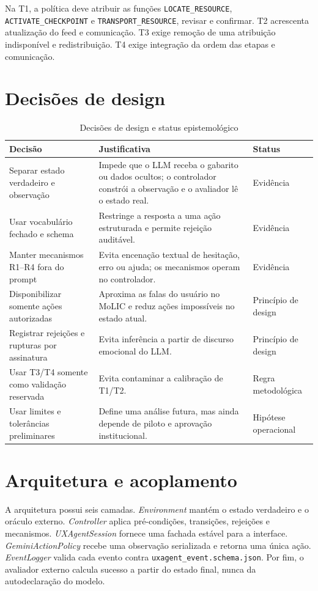 \documentclass[conference]{IEEEtran}
\begin{document}
Na T1, a política deve atribuir as funções
\texttt{LOCATE\_RESOURCE}, \texttt{ACTIVATE\_CHECKPOINT} e
\texttt{TRANSPORT\_RESOURCE}, revisar e confirmar. T2 acrescenta atualização
do feed e comunicação. T3 exige remoção de uma atribuição indisponível e
redistribuição. T4 exige integração da ordem das etapas e comunicação.

\section{Decisões de design}
\begin{table}[t]
\caption{Decisões de design e status epistemológico}
\label{tab:decisions}
\centering
\begin{tabularx}{\textwidth}{p{}p{}p{}}
\toprule
Decisão & Justificativa & Status\\
\midrule
Separar estado verdadeiro e observação & Impede que o LLM receba o gabarito ou dados ocultos; o controlador constrói a observação e o avaliador lê o estado real. & Evidência\\
Usar vocabulário fechado e schema & Restringe a resposta a uma ação estruturada e permite rejeição auditável. & Evidência\\
Manter mecanismos R1--R4 fora do prompt & Evita encenação textual de hesitação, erro ou ajuda; os mecanismos operam no controlador. & Evidência\\
Disponibilizar somente ações autorizadas & Aproxima as falas do usuário no MoLIC e reduz ações impossíveis no estado atual. & Princípio de design\\
Registrar rejeições e rupturas por assinatura & Evita inferência a partir de discurso emocional do LLM. & Princípio de design\\
Usar T3/T4 somente como validação reservada & Evita contaminar a calibração de T1/T2. & Regra metodológica\\
Usar limites e tolerâncias preliminares & Define uma análise futura, mas ainda depende de piloto e aprovação institucional. & Hipótese operacional\\
\bottomrule
\end{tabularx}
\end{table}

\section{Arquitetura e acoplamento}
A arquitetura possui seis camadas. \textit{Environment} mantém o estado
verdadeiro e o oráculo externo. \textit{Controller} aplica pré-condições,
transições, rejeições e mecanismos. \textit{UXAgentSession} fornece uma
fachada estável para a interface. \textit{GeminiActionPolicy} recebe uma
observação serializada e retorna uma única ação. \textit{EventLogger}
valida cada evento contra \texttt{uxagent\_event.schema.json}. Por fim, o
avaliador externo calcula sucesso a partir do estado final, nunca da
autodeclaração do modelo.
\end{document}
